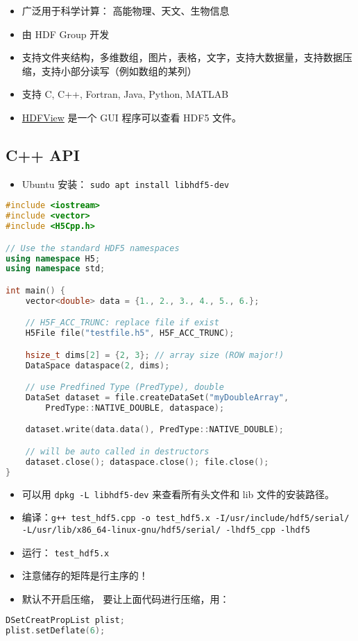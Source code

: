 

\begin{issues}
\issueDraft
\end{issues}

\begin{itemize}
\item 广泛用于科学计算： 高能物理、天文、生物信息
\item 由 HDF Group 开发
\item 支持文件夹结构，多维数组，图片，表格，文字，支持大数据量，支持数据压缩，支持小部分读写（例如数组的某列）
\item 支持 C, C++, Fortran, Java, Python, MATLAB
\item \href{https://www.hdfgroup.org/downloads/hdfview/}{HDFView} 是一个 GUI 程序可以查看 HDF5 文件。
\end{itemize}

\subsection{C++ API}
\begin{itemize}
\item Ubuntu 安装： \verb|sudo apt install libhdf5-dev|
\end{itemize}

\begin{lstlisting}[language=cpp,caption=test\_hdf5.cpp]
#include <iostream>
#include <vector>
#include <H5Cpp.h>

// Use the standard HDF5 namespaces
using namespace H5;
using namespace std;

int main() {
	vector<double> data = {1., 2., 3., 4., 5., 6.};

	// H5F_ACC_TRUNC: replace file if exist
	H5File file("testfile.h5", H5F_ACC_TRUNC);

	hsize_t dims[2] = {2, 3}; // array size (ROW major!)
	DataSpace dataspace(2, dims);

	// use Predfined Type (PredType), double
	DataSet dataset = file.createDataSet("myDoubleArray",
		PredType::NATIVE_DOUBLE, dataspace);

	dataset.write(data.data(), PredType::NATIVE_DOUBLE);

	// will be auto called in destructors
	dataset.close(); dataspace.close(); file.close();
}
\end{lstlisting}
\begin{itemize}
\item 可以用 \verb|dpkg -L libhdf5-dev| 来查看所有头文件和 lib 文件的安装路径。
\item 编译：\verb|g++ test_hdf5.cpp -o test_hdf5.x -I/usr/include/hdf5/serial/ -L/usr/lib/x86_64-linux-gnu/hdf5/serial/ -lhdf5_cpp -lhdf5|
\item 运行： \verb|test_hdf5.x|
\item 注意储存的矩阵是行主序的！
\item 默认不开启压缩， 要让上面代码进行压缩，用：
\end{itemize}
\begin{lstlisting}[language=cpp]
DSetCreatPropList plist;
plist.setDeflate(6);
\end{lstlisting}